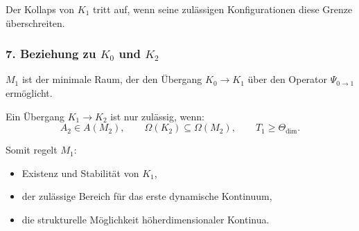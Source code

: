 Der Kollaps von $K_1$ tritt auf, wenn seine zulässigen Konfigurationen diese Grenze überschreiten.

\subsubsection*{7. Beziehung zu \texorpdfstring{$K_0$}{K_0} und \texorpdfstring{$K_2$}{K_2}}

$M_1$ ist der minimale Raum, der den Übergang $K_0 \to K_1$ über den Operator $\Psi_{0\to1}$ ermöglicht.

Ein Übergang $K_1 \to K_2$ ist nur zulässig, wenn:
\[
A_2 \in A(M_2),\qquad
\Omega(K_2) \subseteq \Omega(M_2),\qquad
T_1 \ge \Theta_{\text{dim}}.
\]

Somit regelt $M_1$:

\begin{itemize}
    \item Existenz und Stabilität von $K_1$,
    \item der zulässige Bereich für das erste dynamische Kontinuum,
    \item die strukturelle Möglichkeit höherdimensionaler Kontinua.
\end{itemize}
